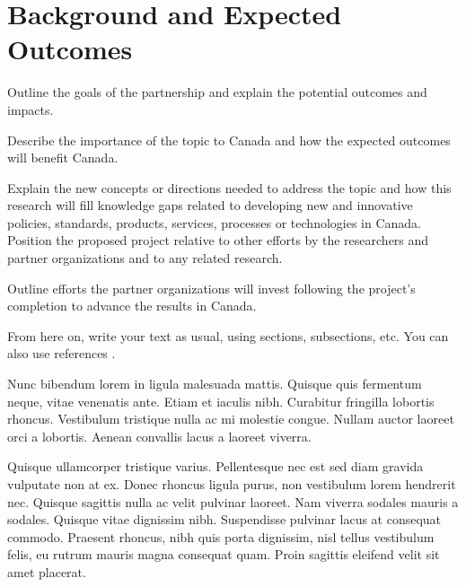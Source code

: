 \documentclass[french]{nserc-alliance}
\begin{document}
\thispagestyle{firstpage}
\maketitle

\section*{Background and Expected Outcomes}
\ifinst\begin{instructions}
\item Outline the goals of the partnership and explain the potential outcomes and impacts.
\item Describe the importance of the topic to Canada and how the expected outcomes will benefit Canada.
\item Explain the new concepts or directions needed to address the topic and how this research will fill knowledge gaps related to developing new and innovative policies, standards, products, services, processes or technologies in Canada. Position the proposed project relative to other efforts by the researchers and partner organizations and to any related research.
\item Outline efforts the partner organizations will invest following the project’s completion to advance the results in Canada.
\end{instructions}\fi

\noindent From here on, write your text as usual, using sections, subsections, etc. You can also use references \cite{DBLPjournals/jsyml/Turing48,DBLPconf/afips/SolomonP76}.

Nunc bibendum lorem in ligula malesuada mattis. Quisque quis fermentum neque, vitae venenatis ante. Etiam et iaculis nibh. Curabitur fringilla lobortis rhoncus. Vestibulum tristique nulla ac mi molestie congue. Nullam auctor laoreet orci a lobortis. Aenean convallis lacus a laoreet viverra.

Quisque ullamcorper tristique varius. Pellentesque nec est sed diam gravida vulputate non at ex. Donec rhoncus ligula purus, non vestibulum lorem hendrerit nec. Quisque sagittis nulla ac velit pulvinar laoreet. Nam viverra sodales mauris a sodales. Quisque vitae dignissim nibh. Suspendisse pulvinar lacus at consequat commodo. Praesent rhoncus, nibh quis porta dignissim, nisl tellus vestibulum felis, eu rutrum mauris magna consequat quam. Proin sagittis eleifend velit sit amet placerat.
\end{document}
